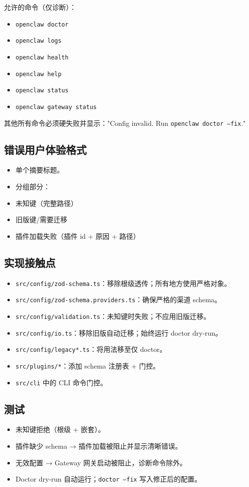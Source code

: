 允许的命令（仅诊断）：

\begin{itemize}
  \item \texttt{openclaw doctor}
  \item \texttt{openclaw logs}
  \item \texttt{openclaw health}
  \item \texttt{openclaw help}
  \item \texttt{openclaw status}
  \item \texttt{openclaw gateway status}
\end{itemize}


其他所有命令必须硬失败并显示："Config invalid. Run \texttt{openclaw doctor --fix}."

\subsection{错误用户体验格式}


\begin{itemize}
  \item 单个摘要标题。
  \item 分组部分：
  \item 未知键（完整路径）
  \item 旧版键/需要迁移
  \item 插件加载失败（插件 id + 原因 + 路径）
\end{itemize}


\subsection{实现接触点}


\begin{itemize}
  \item \texttt{src/config/zod-schema.ts}：移除根级透传；所有地方使用严格对象。
  \item \texttt{src/config/zod-schema.providers.ts}：确保严格的渠道 schema。
  \item \texttt{src/config/validation.ts}：未知键时失败；不应用旧版迁移。
  \item \texttt{src/config/io.ts}：移除旧版自动迁移；始终运行 doctor dry-run。
  \item \texttt{src/config/legacy*.ts}：将用法移至仅 doctor。
  \item \texttt{src/plugins/*}：添加 schema 注册表 + 门控。
  \item \texttt{src/cli} 中的 CLI 命令门控。
\end{itemize}


\subsection{测试}


\begin{itemize}
  \item 未知键拒绝（根级 + 嵌套）。
  \item 插件缺少 schema → 插件加载被阻止并显示清晰错误。
  \item 无效配置 → Gateway 网关启动被阻止，诊断命令除外。
  \item Doctor dry-run 自动运行；\texttt{doctor --fix} 写入修正后的配置。
\end{itemize}



\clearpage
